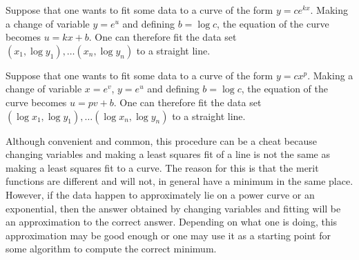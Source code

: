 \documentclass[12pt]{article}
\begin{document}
Suppose that one wants to fit some data to a curve of the form $y = c e^{kx}$.
Making a change of variable $y = e^u$ and defining $b = \log c$, the equation of 
the curve becomes $u = kx + b$.  One can therefore fit the data set $(x_1, \log y_1),
\ldots (x_n, \log y_n)$ to a straight line.

Suppose that one wants to fit some data to a curve of the form $y = cx^p$.  Making
a change of variable $x = e^v$, $y = e^u$ and defining $b = \log c$, the equation of 
the curve becomes $u = pv + b$.  One can therefore fit the data set $(\log x_1, \log y_1),
\ldots (\log x_n, \log y_n)$ to a straight line.

Although convenient and common, this procedure can be a cheat because changing variables
and making a least squares fit of a line is not the same as making a least squares fit
to a curve.  The reason for this is that the merit functions are different and will not,
in general have a minimum in the same place.  However, if the data happen to approximately
lie on a power curve or an exponential, then the answer obtained by changing variables
and fitting will be an approximation to the correct answer.  Depending on what one is
doing, this approximation may be good enough or one may use it as a starting point for
some algorithm to compute the correct minimum.
\end{document}
